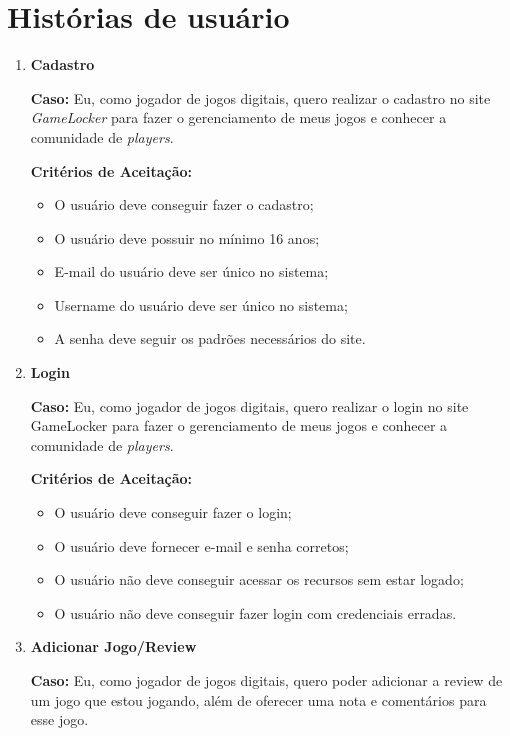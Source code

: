 \section{Histórias de usuário}

\begin{enumerate}
  \item \textbf{Cadastro}
  
  \textbf{Caso:} Eu, como jogador de jogos digitais, quero realizar o cadastro no site \textit{GameLocker} para fazer o gerenciamento de meus jogos e conhecer a comunidade de \textit{players}.
  
  \textbf{Critérios de Aceitação:}
  \begin{itemize}
      \item O usuário deve conseguir fazer o cadastro;
      \item O usuário deve possuir no mínimo 16 anos;
      \item E-mail do usuário deve ser único no sistema;
      \item Username do usuário deve ser único no sistema;
      \item A senha deve seguir os padrões necessários do site.
  \end{itemize}
  
  \item \textbf{Login}

  \textbf{Caso:} Eu, como jogador de jogos digitais, quero realizar o login no site GameLocker para fazer o gerenciamento de meus jogos e conhecer a comunidade de \textit{players}.
  
  \textbf{Critérios de Aceitação:}
  \begin{itemize}
      \item O usuário deve conseguir fazer o login;
      \item O usuário deve fornecer e-mail e senha corretos;
      \item O usuário não deve conseguir acessar os recursos sem estar logado;
      \item O usuário não deve conseguir fazer login com credenciais erradas.
  \end{itemize}
  
   
  \item \textbf{Adicionar Jogo/Review}

  \textbf{Caso:} Eu, como jogador de jogos digitais, quero poder adicionar a review de um jogo que estou jogando, além de oferecer uma nota e comentários para esse jogo.


\end{enumerate}
